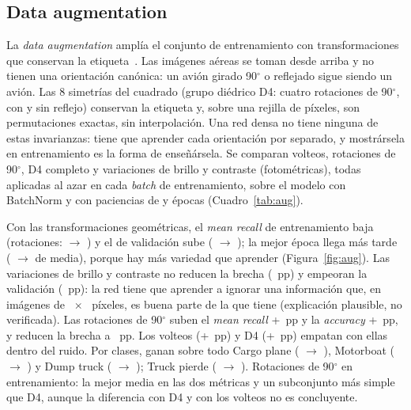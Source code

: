 \subsection{Data augmentation}
La \emph{data augmentation} amplía el conjunto de entrenamiento con transformaciones que conservan la
etiqueta~\cite{goodfellow}. Las imágenes aéreas se toman desde arriba y no tienen una orientación canónica: un avión
girado 90$^\circ$ o reflejado sigue siendo un avión. Las 8 simetrías del cuadrado (grupo diédrico D4: cuatro
rotaciones de 90$^\circ$, con y sin reflejo) conservan la etiqueta y, sobre una rejilla de píxeles, son permutaciones
exactas, sin interpolación. Una red densa no tiene ninguna de estas invarianzas: tiene que aprender cada orientación
por separado, y mostrársela en entrenamiento es la forma de enseñársela. Se comparan volteos, rotaciones de
90$^\circ$, D4 completo y variaciones de brillo y contraste (fotométricas), todas aplicadas al azar en cada
\emph{batch} de entrenamiento, sobre el modelo con BatchNorm y con paciencias de  y
 épocas (Cuadro~\ref{tab:aug}).

{Con las transformaciones geométricas, el \emph{mean recall} de entrenamiento baja (rotaciones:
 $\rightarrow$ ) y el de validación sube
( $\rightarrow$ ); la mejor época llega más tarde
( $\rightarrow$  de media), porque hay más variedad que aprender
(Figura~\ref{fig:aug}). Las variaciones de brillo y contraste no reducen la brecha
(~pp) y empeoran la validación (~pp): la red tiene que aprender a ignorar una
información que, en imágenes de ~$\times$~ píxeles, es buena parte de la que tiene
(explicación plausible, no verificada).}
{Las rotaciones de 90$^\circ$ suben el \emph{mean recall} +~pp y la \emph{accuracy}
+~pp, y reducen la brecha a ~pp. Los volteos (+~pp) y D4
(+~pp) empatan con ellas dentro del ruido. Por clases, ganan sobre todo Cargo plane ( $\rightarrow$
), Motorboat ( $\rightarrow$
) y Dump truck ( $\rightarrow$
); Truck pierde ( $\rightarrow$ ).}
{Rotaciones de 90$^\circ$ en entrenamiento: la mejor media en las dos métricas y un subconjunto más simple que D4,
aunque la diferencia con D4 y con los volteos no es concluyente.}

